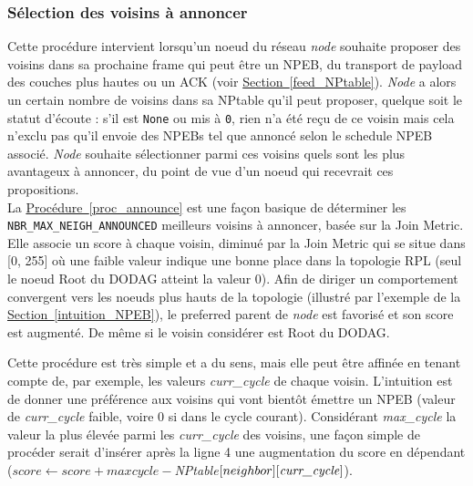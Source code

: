\documentclass[]{report}
\newcommand{\wordlink}[2]{\hyperref[#2]{#1~\ref{#2}}}
\begin{document}
\subsubsection{Sélection des voisins à annoncer}

Cette procédure intervient lorsqu'un noeud du réseau \textit{node} souhaite proposer des voisins dans sa prochaine frame qui peut être un NPEB, du transport de payload des couches plus hautes ou un ACK (voir \wordlink{Section}{feed_NPtable}). \textit{Node} a alors un certain nombre de voisins dans sa NPtable qu'il peut proposer, quelque soit le statut d'écoute : s'il est \texttt{None} ou mis à \texttt{0}, rien n'a été reçu de ce voisin mais cela n'exclu pas qu'il envoie des NPEBs tel que annoncé selon le schedule NPEB associé. \textit{Node} souhaite sélectionner parmi ces voisins quels sont les plus avantageux à annoncer, du point de vue d'un noeud qui recevrait ces propositions.\\

La \wordlink{Procédure}{proc_announce} est une façon basique de déterminer les \texttt{NBR\_MAX\_NEIGH\_ANNOUNCED} meilleurs voisins à annoncer, basée sur la Join Metric. Elle associe un score à chaque voisin, diminué par la Join Metric qui se situe dans [0, 255] où une faible valeur indique une bonne place dans la topologie RPL (seul le noeud Root du DODAG atteint la valeur 0). Afin de diriger un comportement convergent vers les noeuds plus hauts de la topologie (illustré par l'exemple de la \wordlink{Section}{intuition_NPEB}), le preferred parent de \textit{node} est favorisé et son score est augmenté. De même si le voisin considérer est Root du DODAG.\\

\newpage

Cette procédure est très simple et a du sens, mais elle peut être affinée en tenant compte de, par exemple, les valeurs \textit{curr\_cycle} de chaque voisin. L'intuition est de donner une préférence aux voisins qui vont bientôt émettre un NPEB (valeur de \textit{curr\_cycle} faible, voire 0 si dans le cycle courant). Considérant \textit{max\_cycle} la valeur la plus élevée parmi les \textit{curr\_cycle} des voisins, une façon simple de procéder serait d'insérer après la ligne 4 une augmentation du score en dépendant ($score \leftarrow score +  maxcycle - $\textit{NPtable}$[neighbor][\text{\textit{curr\_cycle}}]$).
\end{document}
